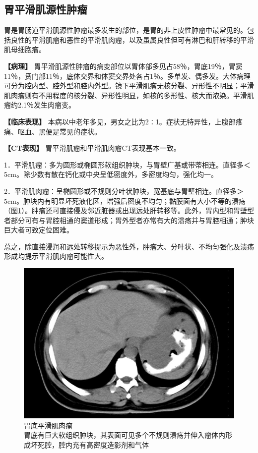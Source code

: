 \subsection{胃平滑肌源性肿瘤}

胃是胃肠道平滑肌源性肿瘤最多发生的部位，是胃的非上皮性肿瘤中最常见的。包括良性的平滑肌瘤和恶性的平滑肌肉瘤，以及虽属良性但可有淋巴和肝转移的平滑肌母细胞瘤。

\textbf{【病理】}
胃平滑肌源性肿瘤的病变部位以胃体部多见占58％，胃底19％，胃窦11％，贲门部11％，底体交界和体窦交界处各占1％。多单发、偶多发。大体病理可分为腔内型、腔外型和腔内外型。镜下平滑肌瘤无核分裂、异形性不明显；平滑肌肉瘤则有不用程度的核分裂、异形性明显，如核的多形性、核大而浓染。平滑肌瘤约2.1％发生肉瘤变。

\textbf{【临床表现】}
本病以中老年多见，男女之比为2∶1。症状无特异性，上腹部疼痛、呕血、黑便是常见的症状。

\textbf{【CT表现】} 胃平滑肌瘤和平滑肌肉瘤CT表现基本一致。

1．平滑肌瘤：多为圆形或椭圆形软组织肿块，与胃壁广基或带蒂相连。直径多＜5cm。除少数有散在钙化或中央呈低密度外，多密度均匀，强化均一。

2．平滑肌肉瘤：呈椭圆形或不规则分叶状肿块，宽基底与胃壁相连。直径多＞5cm。肿块内有明显坏死液化区，增强后密度不均匀；黏膜面有大小不等的溃疡（图\ref{fig17-6}）。肿瘤还可直接侵及邻近脏器或出现远处肝转移等。此外，胃内型和胃壁型者部分可有与胃腔相通的窦道形成；胃外型者亦常有大的溃疡并与胃腔相通；肿块巨大者可致定位困难。

总之，除直接浸润和远处转移提示为恶性外，肿瘤大、分叶状、不均匀强化及溃疡形成均提示平滑肌肉瘤可能性大。

\begin{figure}[!htbp]
 \centering
 \includegraphics[width=.7\textwidth,height=\textheight,keepaspectratio]{./images/Image00357.jpg}
 \captionsetup{justification=centering}
 \caption{胃底平滑肌肉瘤\\{\small 胃底有巨大软组织肿块，其表面可见多个不规则溃疡并伸入瘤体内形成坏死腔，腔内充有高密度造影剂和气体}}
 \label{fig17-6}
  \end{figure} 

